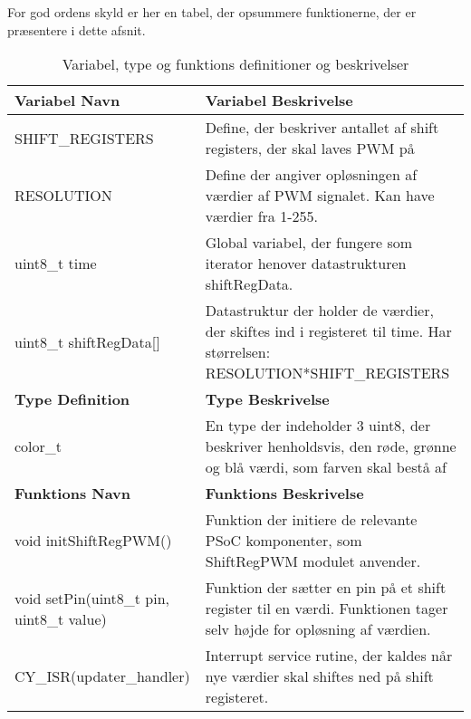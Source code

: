 \documentclass[Softwaredesign/Softwaredesign_main.tex]{subfiles}
\begin{document}
For god ordens skyld er her en tabel, der opsummere funktionerne, der er præsentere i dette afsnit.


\begin{longtable}{|L{0.45\textwidth}|L{0.45\textwidth}|}
\caption{Variabel, type og funktions definitioner og beskrivelser}
\label{CupLightDef_tab}
\hline
\textbf{Variabel Navn}                          & \textbf{Variabel Beskrivelse}                                                                                                                                                                \\ \hline
SHIFT\_REGISTERS                                & Define, der beskriver antallet af shift registers, der skal laves PWM på \\ \hline
RESOLUTION                                      & Define der angiver opløsningen af værdier af PWM signalet. Kan have værdier fra 1-255. \\ \hline
uint8\_t time                                   & Global variabel, der fungere som iterator henover datastrukturen shiftRegData.\\ \hline
uint8\_t shiftRegData{[}{]}                     & Datastruktur der holder de værdier, der skiftes ind i registeret til time. Har størrelsen: RESOLUTION*SHIFT\_REGISTERS\\ \hline
\textbf{Type Definition}                        & \textbf{Type Beskrivelse}                                                                                                                                                                    \\ \hline
color\_t                                        & En type der indeholder 3 uint8, der beskriver henholdsvis, den røde, grønne og blå værdi, som farven skal bestå af\\ \hline
\textbf{Funktions Navn}                         & \textbf{Funktions Beskrivelse}                                                                                                                                                               \\ \hline
void initShiftRegPWM()                          & Funktion der initiere de relevante PSoC komponenter, som ShiftRegPWM modulet anvender.\\ \hline
void setPin(uint8\_t pin, uint8\_t value)       & Funktion der sætter en pin på et shift register til en værdi. Funktionen tager selv højde for opløsning af værdien.\\ \hline
CY\_ISR(updater\_handler)                       & Interrupt service rutine, der kaldes når nye værdier skal shiftes ned på shift registeret.\\ \hline

\end{longtable}
\end{document}
